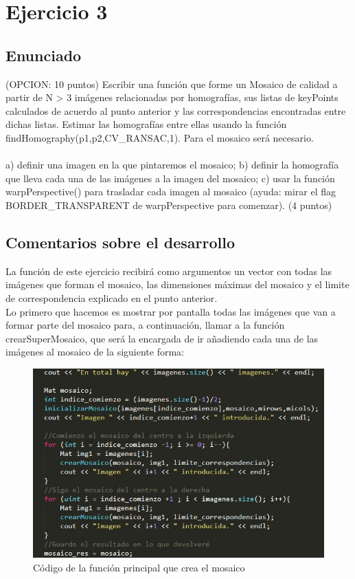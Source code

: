 \newpage
\section{Ejercicio 3}

\subsection{Enunciado}

(OPCION: 10 puntos) Escribir una función que forme un Mosaico de calidad a partir de N > 3 imágenes relacionadas por homografías, sus listas de keyPoints calculados de acuerdo al punto anterior y las correspondencias encontradas entre dichas listas. Estimar las homografías entre ellas usando la función findHomography(p1,p2,CV\_RANSAC,1). Para el mosaico será necesario.\\
\\
a) definir una imagen en la que pintaremos el mosaico; b) definir la homografía que lleva cada una de las imágenes a la imagen del mosaico; c) usar la función warpPerspective() para trasladar cada imagen al mosaico (ayuda: mirar el flag BORDER\_TRANSPARENT de warpPerspective para comenzar). (4 puntos)

\subsection{Comentarios sobre el desarrollo}

La función de este ejercicio recibirá como argumentos un vector con todas las imágenes que forman el mosaico, las dimensiones máximas del mosaico y el limite de correspondencia explicado en el punto anterior.\\

Lo primero que hacemos es mostrar por pantalla todas las imágenes que van a formar parte del mosaico para, a continuación, llamar a la función crearSuperMosaico, que será la encargada de ir añadiendo cada una de las imágenes al mosaico de la siguiente forma:

\begin{figure}[H]
	\centering
	\includegraphics[width=0.7\linewidth]{supermosaico}
	\caption{Código de la función principal que crea el mosaico}
\end{figure}

